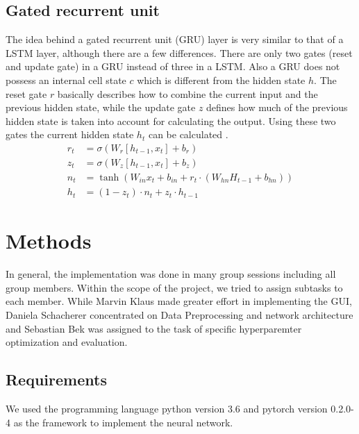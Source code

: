 \documentclass[11pt,a4paper,bibliography=totocnumbered,listof=totocnumbered]{scrartcl}
\begin{document}
\subsection{Gated recurrent unit}
The idea behind a gated recurrent unit (GRU) layer is very similar to that of a LSTM layer, although there are a few differences. There are only two gates (reset and update gate)  in a GRU instead of three in a LSTM. Also a GRU does not possess an internal cell state $c$ which is different from the hidden state $h$. The reset gate $r$ basically describes how to combine the current input and the previous hidden state, while the update gate $z$ defines how much of the previous hidden state is taken into account for calculating the output. Using these two gates the current hidden state $h_t$ can be calculated \cite{gulli2017deep}. 
\begin{align*}
	r_t &= \sigma(W_r [h_{t-1},x_t] + b_r) \\
	z_t &= \sigma(W_z [h_{t-1},x_t] + b_z) \\
	n_t &= \tanh(W_{in} x_t + b_{in} + r_t \cdot (W_{hn}H_{t-1} + b_{hn})) \\
	h_t &= (1-z_t) \cdot n_t + z_t \cdot h_{t-1}
\end{align*}

\pagebreak


%
\section{Methods}
In general, the implementation was done in many group sessions including all group members. 
Within the scope of the project, we tried to assign subtasks to each member. While Marvin Klaus made greater effort in implementing the GUI, Daniela Schacherer concentrated on Data Preprocessing and network architecture and Sebastian Bek was assigned to the task of specific hyperparemter optimization and evaluation. 

\subsection{Requirements}
We used the programming language python version 3.6 and pytorch version 0.2.0-4 as the framework to implement the neural network. 
\end{document}
